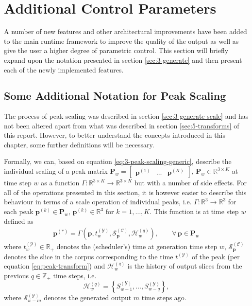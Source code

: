 \section{Additional Control Parameters}\label{sec:6-model-improvements}
A number of new features and other architectural improvements have been added to the main runtime framework to improve the quality of the output as well as give the user a higher degree of parametric control. This section will briefly expand upon the notation presented in section \ref{sec:3-generate} and then present each of the newly implemented features.

\subsection{Some Additional Notation for Peak Scaling}\label{ssec:runtime-recap}

The process of peak scaling was described in section \ref{sec:3-generate-scale} and has not been altered apart from what was described in section \ref{sec:5-transforms} of this report. However, to better understand the concepts introduced in this chapter, some further definitions will be necessary. 

Formally, we can, based on equation \ref{eq:3-peak-scaling-generic}, describe the individual scaling of a peak matrix $\bm P_w = \begin{bmatrix} \bm p^{(1)} & \dots & \bm p^{(K)} \end{bmatrix}$, $\bm P_w \in \mathbb R^{3\times K}$ at time step $w$ as a function $\Gamma \colon \mathbb R^{3\times K} \rightarrow \mathbb R^{3\times K}$ but with a number of side effects. For all of the operations presented in this section, it is however easier to describe this behaviour in terms of a scale operation of individual peaks, i.e. $\Gamma \colon \mathbb R^3 \rightarrow \mathbb R^3$ for each peak $\bm p^{(k)} \in \bm P_w$, $\bm p^{(k)} \in \mathbb R^3$ for $k = 1,\dots,K$. This function is at time step $w$ defined as 
	\begin{align}
		\bm{p^{(\ast)}} =  \Gamma\left(\bm p, t^{(\mathcal Y)}_w, \mathcal S^{(\mathcal C)}_{\bm p}, \mathcal H_w^{(q)}\right), \qquad \forall\, \bm p \in \bm P_w
	\end{align}
	where $t^{(\mathcal Y)}_w \in \mathbb R_+$ denotes the (scheduler's) time at generation time step $w$, $\mathcal S^{(\mathcal C)}_{\bm p}$ denotes the slice in the corpus corresponding to the time $t^{(\mathcal Y)}$ of the peak (per equation \ref{eq:peak-transform}) and $\mathcal H_w^{(q)}$ is the history of output slices from the previous $q \in \mathbb Z_+$ time steps, i.e. 
	\begin{equation}
		\mathcal H_w^{(q)} = \left\lbrace S^{(\mathcal Y)}_{w-1},\dots,S^{(\mathcal Y)}_{w-q}\right\rbrace,
	\end{equation}
	where $\mathcal S^{(\mathcal Y)}_{w-m}$ denotes the generated output $m$ time steps ago.
	
